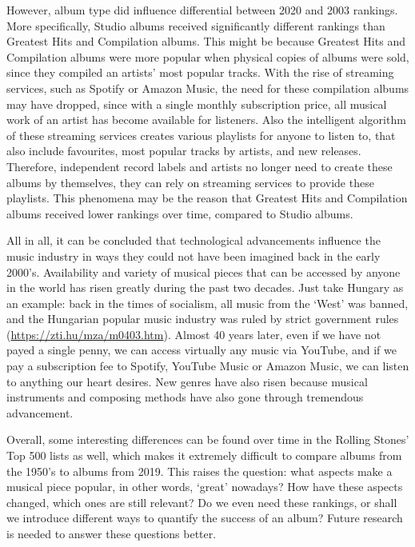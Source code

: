\documentclass[
]{article}
\begin{document}
However, album type did influence differential between 2020 and 2003
rankings. More specifically, Studio albums received significantly
different rankings than Greatest Hits and Compilation albums. This might
be because Greatest Hits and Compilation albums were more popular when
physical copies of albums were sold, since they compiled an artists'
most popular tracks. With the rise of streaming services, such as
Spotify or Amazon Music, the need for these compilation albums may have
dropped, since with a single monthly subscription price, all musical
work of an artist has become available for listeners. Also the
intelligent algorithm of these streaming services creates various
playlists for anyone to listen to, that also include favourites, most
popular tracks by artists, and new releases. Therefore, independent
record labels and artists no longer need to create these albums by
themselves, they can rely on streaming services to provide these
playlists. This phenomena may be the reason that Greatest Hits and
Compilation albums received lower rankings over time, compared to Studio
albums.

All in all, it can be concluded that technological advancements
influence the music industry in ways they could not have been imagined
back in the early 2000's. Availability and variety of musical pieces
that can be accessed by anyone in the world has risen greatly during the
past two decades. Just take Hungary as an example: back in the times of
socialism, all music from the `West' was banned, and the Hungarian
popular music industry was ruled by strict government rules
(\url{https://zti.hu/mza/m0403.htm}). Almost 40 years later, even if we
have not payed a single penny, we can access virtually any music via
YouTube, and if we pay a subscription fee to Spotify, YouTube Music or
Amazon Music, we can listen to anything our heart desires. New genres
have also risen because musical instruments and composing methods have
also gone through tremendous advancement.

Overall, some interesting differences can be found over time in the
Rolling Stones' Top 500 lists as well, which makes it extremely
difficult to compare albums from the 1950's to albums from 2019. This
raises the question: what aspects make a musical piece popular, in other
words, `great' nowadays? How have these aspects changed, which ones are
still relevant? Do we even need these rankings, or shall we introduce
different ways to quantify the success of an album? Future research is
needed to answer these questions better.
\end{document}
